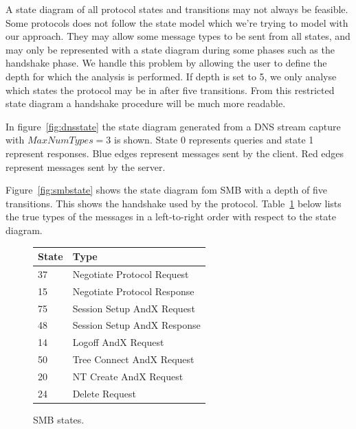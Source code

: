 \documentclass[a4paper]{report}
\begin{document}
A state diagram of all protocol states and transitions may not always be
feasible. Some protocols does not follow the state model which we're 
trying to model with our approach. They may allow some message types to
be sent from all states, and may only be represented with a state diagram
during some phases such as the handshake phase. We handle this problem by
allowing the user to define the depth for which the analysis is performed.
If depth is set to 5, we only analyse which states the protocol may be in
after five transitions. From this restricted state diagram a handshake
procedure will be much more readable.


In figure~\ref{fig:dnsstate} the state diagram generated from a DNS stream
capture with $MaxNumTypes = 3$ is shown. State 0 represents queries and state 1
represent responses. Blue edges represent messages sent by the client. Red
edges represent messages sent by the server.

Figure~\ref{fig:smbstate} shows the state diagram fom SMB with a depth of
five transitions. This shows the handshake used by the protocol.
Table~\ref{table:smb} below lists the true types of the messages in a
left-to-right order with respect to the state diagram.

\begin{figure}
    \centering
    \begin{tabular}{ | l | l |}
        \hline
        \textbf{State}&\textbf{Type}\\ \hline
        37          & Negotiate Protocol Request    \\ \hline
        15          & Negotiate Protocol Response   \\ \hline
        75          & Session Setup AndX Request    \\ \hline
        48          & Session Setup AndX Response   \\ \hline
        14          & Logoff AndX Request           \\ \hline
        50          & Tree Connect AndX Request     \\ \hline
        20          & NT Create AndX Request        \\ \hline
        24          & Delete Request                \\ \hline
    \end{tabular}
    \caption{SMB states.}
    \label{table:smb}
\end{figure}
\end{document}
